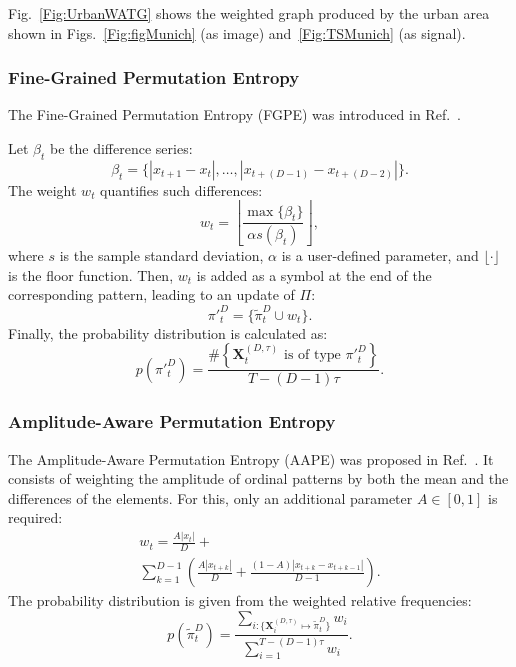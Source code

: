 \documentclass[journal]{IEEEtran}
\begin{document}
	Fig.~\ref{Fig:UrbanWATG} shows the weighted graph produced by the urban area shown in Figs.~\ref{Fig:figMunich} (as image) and~\ref{Fig:TSMunich} (as signal).
	
	\subsubsection{Fine-Grained Permutation Entropy}\label{FGPE}
	
	The Fine-Grained Permutation Entropy (FGPE) was introduced in Ref.~\cite{xiao2009fine}.
	
	Let $\beta_t$ be the difference series:
	\begin{equation}
	\beta_t = \big\{|x_{t+1} - x_t|, \dots, |x_{t+(D-1)} - x_{t+(D-2)}|\big\}.
	\end{equation}
	The weight $w_t$ quantifies such differences:
	\begin{equation}
	w_t = \left \lfloor \frac{\max\{\beta_t\}}{\alpha s(\beta_t) } \right \rfloor,
	\end{equation}
	where $s$ is the sample standard deviation,
	$\alpha$ is a user-defined parameter, 
	and $\lfloor\cdot \rfloor$ is the floor function.
	Then, $w_t$ is added as a symbol at the end of the corresponding pattern, leading to an update of $\Pi$:
	\begin{equation}
	\pi{'}_t^D = \{ \widetilde \pi_t^D \cup w_t\}.
	\end{equation} 
	Finally, the probability distribution is calculated as:
	\begin{equation}
	p(\pi{'}_t^D) = \frac{\#\left \{\mathbf{X}_t^{(D,\tau)} \text{ is of type } \pi{'}_t^D\right \}}{T- (D-1)\tau}.
	\end{equation}
	
	\subsubsection{Amplitude-Aware Permutation Entropy}\label{AAPE}
	
	The Amplitude-Aware Permutation Entropy (AAPE) was proposed in Ref.~\cite{azami2016amplitude}.
	It consists of weighting the amplitude of ordinal patterns by both the mean and the differences of the elements.
	For this, only an additional parameter $ A \in [0, 1]$ is required:
	\begin{multline}
	w_t = \frac{A  |x_t|}{D} + \\ \sum_{k = 1}^{D - 1} \left(\frac{A  |x_{t + k}|}{D} + \frac{(1 - A)  |x_{t+k} - x_{t+k-1}|}{D - 1}\right).
	\end{multline}
	The probability distribution is given from the weighted relative frequencies:
	\begin{equation}
	p(\widetilde \pi_t^D) = \frac{\sum_{i : \{\mathbf{X}^{(D,\tau)}_i \mapsto \widetilde\pi^D_t\}} w_{i}}{\sum_{i = 1}^{T-(D-1)\tau} w_{i}}.
	\end{equation}
	
\end{document}
